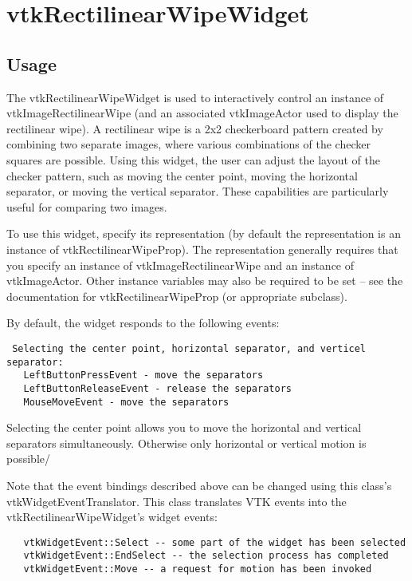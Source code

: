 \section{vtkRectilinearWipeWidget}

\subsection{Usage}

 The vtkRectilinearWipeWidget is used to interactively control an instance
 of vtkImageRectilinearWipe (and an associated vtkImageActor used to
 display the rectilinear wipe). A rectilinear wipe is a 2x2 checkerboard
 pattern created by combining two separate images, where various
 combinations of the checker squares are possible. Using this widget, the
 user can adjust the layout of the checker pattern, such as moving the
 center point, moving the horizontal separator, or moving the vertical
 separator. These capabilities are particularly useful for comparing two
 images.
 
 To use this widget, specify its representation (by default the
 representation is an instance of vtkRectilinearWipeProp). The
 representation generally requires that you specify an instance of
 vtkImageRectilinearWipe and an instance of vtkImageActor. Other instance
 variables may also be required to be set -- see the documentation for
 vtkRectilinearWipeProp (or appropriate subclass).

 By default, the widget responds to the following events:
 \begin{verbatim}
 Selecting the center point, horizontal separator, and verticel separator:
   LeftButtonPressEvent - move the separators
   LeftButtonReleaseEvent - release the separators 
   MouseMoveEvent - move the separators
 \end{verbatim}
 Selecting the center point allows you to move the horizontal and vertical
 separators simultaneously. Otherwise only horizontal or vertical motion
 is possible/

 Note that the event bindings described above can be changed using this
 class's vtkWidgetEventTranslator. This class translates VTK events into
 the vtkRectilinearWipeWidget's widget events:
 \begin{verbatim}
   vtkWidgetEvent::Select -- some part of the widget has been selected
   vtkWidgetEvent::EndSelect -- the selection process has completed
   vtkWidgetEvent::Move -- a request for motion has been invoked
 \end{verbatim}

